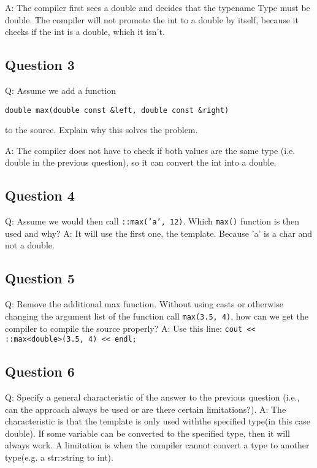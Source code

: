 \documentclass[11pt]{article}
\begin{document}
A: The compiler first sees a double and decides that the typename Type must be double.
The compiler will not promote the int to a double by itself, because it checks if the int is a double, which it isn't.

\subsection*{Question 3}
Q: Assume we add a function
\begin{lstlisting}
double max(double const &left, double const &right)
\end{lstlisting}
to the source. Explain why this solves the problem.

A: The compiler does not have to check if both values are the same type (i.e. double in the previous question), so it can convert the int into a double. 

\subsection*{Question 4}
Q: Assume we would then call \texttt{::max('a', 12)}. Which \texttt{max()} function is then used and why?
A: It will use the first one, the template. Because 'a' is a char and not a double.

\subsection*{Question 5}
Q: Remove the additional max function. Without using casts or otherwise changing the argument list of the function call \texttt{max(3.5, 4)}, how can we get the compiler to compile the source properly?
A: Use this line: \texttt{cout << ::max<double>(3.5, 4) << endl;}



\subsection*{Question 6}
Q: Specify a general characteristic of the answer to the previous question (i.e., can the approach always be used or are there certain limitations?).
A: The characteristic is that the template is only used withthe specified type(in this case double). If some variable can be converted to the specified type, then it will always work. A limitation is when the compiler cannot convert a type to another type(e.g. a str::string to int).
\end{document}
